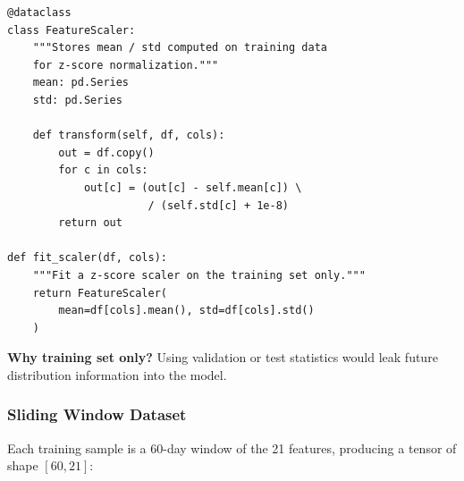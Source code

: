 \documentclass[12pt,a4paper]{article}
\begin{document}
\begin{lstlisting}[caption={Feature normalization (src/data/preprocessing.py)}]
@dataclass
class FeatureScaler:
    """Stores mean / std computed on training data
    for z-score normalization."""
    mean: pd.Series
    std: pd.Series

    def transform(self, df, cols):
        out = df.copy()
        for c in cols:
            out[c] = (out[c] - self.mean[c]) \
                      / (self.std[c] + 1e-8)
        return out

def fit_scaler(df, cols):
    """Fit a z-score scaler on the training set only."""
    return FeatureScaler(
        mean=df[cols].mean(), std=df[cols].std()
    )
\end{lstlisting}

\textbf{Why training set only?} Using validation or test statistics would leak future distribution information into the model.

\subsubsection{Sliding Window Dataset}

Each training sample is a 60-day window of the 21 features, producing a tensor of shape $[60, 21]$:
\end{document}
